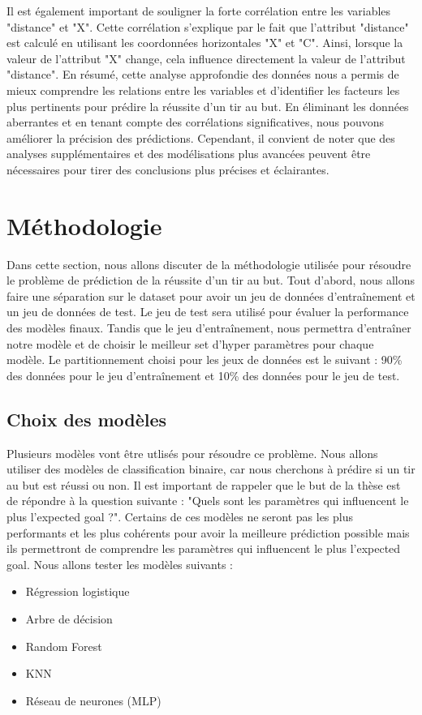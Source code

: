 \documentclass[12pt]{article}
\begin{document}
Il est également important de souligner la forte corrélation entre les variables "distance" et "X". 
Cette corrélation s'explique par le fait que l'attribut "distance" est calculé en utilisant les coordonnées horizontales "X" et "C". 
Ainsi, lorsque la valeur de l'attribut "X" change, cela influence directement la valeur de l'attribut "distance". 
\newline\newline
En résumé, cette analyse approfondie des données nous a permis de mieux comprendre les relations entre les variables et d'identifier les facteurs les plus pertinents pour prédire la réussite d'un tir au but. 
En éliminant les données aberrantes et en tenant compte des corrélations significatives, nous pouvons améliorer la précision des prédictions.
Cependant, il convient de noter que des analyses supplémentaires et des modélisations plus avancées peuvent être nécessaires pour tirer des conclusions plus précises et éclairantes.

\newpage

\section{Méthodologie}
\label{sec:methodologie}
Dans cette section, nous allons discuter de la méthodologie utilisée pour résoudre le problème de prédiction de la réussite d'un tir au but.
Tout d'abord, nous allons faire une séparation sur le dataset pour avoir un jeu de données d'entraînement et un jeu de données de test.
Le jeu de test sera utilisé pour évaluer la performance des modèles finaux. 
Tandis que le jeu d'entraînement, nous permettra d'entraîner notre modèle et de choisir le meilleur set d'hyper paramètres pour chaque modèle.
Le partitionnement choisi pour les jeux de données est le suivant : 90\% des données pour le jeu d'entraînement et 10\% des données pour le jeu de test.

\subsection{Choix des modèles}
Plusieurs modèles vont être utlisés pour résoudre ce problème.
Nous allons utiliser des modèles de classification binaire, car nous cherchons à prédire si un tir au but est réussi ou non.
Il est important de rappeler que le but de la thèse est de répondre à la question suivante : "Quels sont les paramètres qui influencent le plus l'expected goal ?".
Certains de ces modèles ne seront pas les plus performants et les plus cohérents pour avoir la meilleure prédiction possible mais ils permettront de comprendre les paramètres qui influencent le plus l'expected goal.
Nous allons tester les modèles suivants :
\begin{itemize}
    \item Régression logistique
    \item Arbre de décision
    \item Random Forest
    \item KNN
    \item Réseau de neurones (MLP)
\end{itemize}
\end{document}
